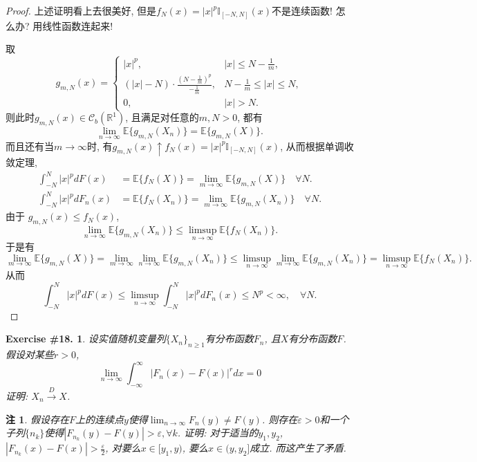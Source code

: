 \documentclass[UTF8, a4paper]{article}
\newtheorem{exercise}{Exercise \#18.}
\newtheorem*{remark}{注}
\begin{document}
\begin{proof}
上述证明看上去很美好, 但是\(f_N(x) = |x|^p \mathbb{I}_{[-N,N]}(x)\)不是连续函数!
怎么办? 用线性函数连起来!

取
$$
g_{m,N}(x) = \begin{cases}
    |x|^p, & |x| \leq N - \frac{1}{m}, \\
    (|x| - N) \cdot \frac{\left(N - \frac{1}{m}\right)^p}{-\frac{1}{m}}, & N - \frac{1}{m} \leq |x| \leq N, \\
    0, & |x| > N.
\end{cases}
$$
则此时\(g_{m,N}(x) \in \mathscr{C}_b(\mathbb{R}^1)\), 且满足对任意的\(m,N > 0\), 都有 
$$
\lim_{n\to \infty} \mathbb{E}\{g_{m,N}(X_n)\} = \mathbb{E}\{g_{m,N}(X)\}.
$$
而且还有当\(m \to\infty\)时, 有\(g_{m,N}(x) \uparrow f_N(x) = |x|^p \mathbb{I}_{[-N,N]}(x)\), 从而根据单调收敛定理,
$$
\begin{aligned}
    \int_{-N}^{N} |x|^p dF(x) &= \mathbb{E}\{f_N(X)\} = \lim_{m\to\infty} \mathbb{E}\{g_{m,N}(X)\} \quad \forall N. \\
    \int_{-N}^{N} |x|^p dF_n(x) &= \mathbb{E}\{f_N(X_n)\} = \lim_{m\to\infty} \mathbb{E}\{g_{m,N}(X_n)\} \quad \forall N.
\end{aligned}
$$
由于 \(g_{m,N}(x) \leq f_N(x)\), 
$$
\lim_{n\to\infty} \mathbb{E}\{g_{m,N}(X_n)\} \leq \limsup_{n\to\infty} \mathbb{E}\{f_N(X_n)\}.
$$
于是有
$$
\lim_{m\to\infty} \mathbb{E}\{g_{m,N}(X)\} = \lim_{m\to\infty} \lim_{n\to\infty} \mathbb{E}\{g_{m,N}(X_n)\} \leq \limsup_{n\to\infty} \lim_{m\to\infty} \mathbb{E}\{g_{m,N}(X_n)\} = \limsup_{n\to\infty} \mathbb{E}\{f_N(X_n)\}.
$$
从而 
$$
\int_{-N}^{N} |x|^p dF(x) \leq \limsup_{n\to\infty} \int_{-N}^{N} |x|^p dF_n(x) \leq N^p < \infty, \quad \forall N.
$$


\end{proof}


\begin{framed}
\begin{exercise}
设实值随机变量列\(\{X_n\}_{n\geq 1}\)有分布函数\(F_n\), 且\(X\)有分布函数\(F\). 假设对某些\(r >0\), 
$$
\lim _{n \rightarrow \infty} \int_{-\infty}^{\infty}\left|F_n(x)-F(x)\right|^r d x=0
$$
证明: \(X_n \xrightarrow{D}X\).
\end{exercise}
\end{framed}

\begin{remark}
假设存在\(F\)上的连续点\(y\)使得\(\lim_{n\to\infty} F_n(y) \neq F(y)\).
则存在\(\varepsilon > 0\)和一个子列\(\{n_k\}\)使得\(|F_{n_k}(y) - F(y)| > {\varepsilon}, \forall k\).
证明: 对于适当的\(y_1,y_2\), \(|F_{n_k}(x) - F(x)| > \frac{\varepsilon}{2}\), 对要么\(x \in [y_1, y)\), 要么\(x \in (y, y_2]\)成立.
而这产生了矛盾.
\end{remark}
\end{document}
